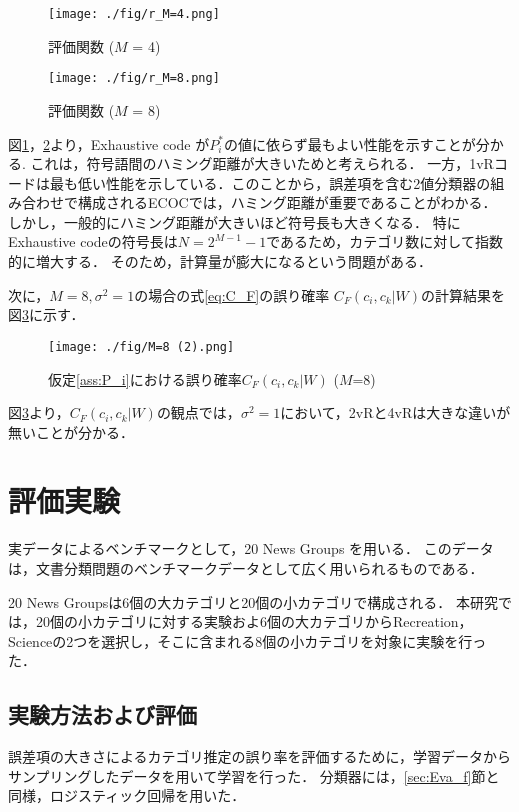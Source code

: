 \documentclass{jarticle}
\theoremstyle{definition}
\begin{document}
\begin{figure}[!t]
\begin{center}
\texttt{[image: ./fig/r\_M=4.png]} 
\caption{評価関数 ($M$ = 4)}
\label{fig:M=4}
\end{center}
\end{figure}

\begin{figure}[!t]
\begin{center}
\texttt{[image: ./fig/r\_M=8.png]} 
\caption{評価関数 ($M$ = 8)}
\label{fig:M=8}
\end{center}
\end{figure}


図\ref{fig:M=4}，\ref{fig:M=8}より，Exhaustive code が$P^*_i$の値に依らず最もよい性能を示すことが分かる.
これは，符号語間のハミング距離が大きいためと考えられる．
一方，1vRコードは最も低い性能を示している．このことから，誤差項を含む2値分類器の組み合わせで構成されるECOCでは，ハミング距離が重要であることがわかる．
しかし，一般的にハミング距離が大きいほど符号長も大きくなる．
特に Exhaustive codeの符号長は$N = 2^{M-1}-1$であるため，カテゴリ数に対して指数的に増大する．
そのため，計算量が膨大になるという問題がある．

次に，$M = 8, \sigma^2 = 1$の場合の式\eqref{eq:C_F}の誤り確率 $C_F(c_i,c_k|W)$の計算結果を図\ref{fig:M=8_Pe}に示す．
\begin{figure}[!t]
\begin{center}
\texttt{[image: ./fig/M=8 (2).png]} 
\caption{仮定\ref{ass:P_i}における誤り確率$C_F(c_i,c_k|W)$  ($M$=8)}
\label{fig:M=8_Pe}
\end{center}
\end{figure}
図\ref{fig:M=8_Pe}より，$C_F(c_i,c_k|W)$の観点では，$\sigma^2 = 1$において，2vRと4vRは大きな違いが無いことが分かる．

\section{評価実験}
実データによるベンチマークとして，20 News Groups \cite{lang1995newsweeder}を用いる．
このデータは，文書分類問題のベンチマークデータとして広く用いられるものである．

20 News Groupsは6個の大カテゴリと20個の小カテゴリで構成される．
本研究では，20個の小カテゴリに対する実験およ6個の大カテゴリからRecreation，Scienceの2つを選択し，そこに含まれる8個の小カテゴリを対象に実験を行った．

\subsection{実験方法および評価}
誤差項の大きさによるカテゴリ推定の誤り率を評価するために，学習データからサンプリングしたデータを用いて学習を行った．
分類器には，\ref{sec:Eva_f}節と同様，ロジスティック回帰を用いた．
\end{document}
